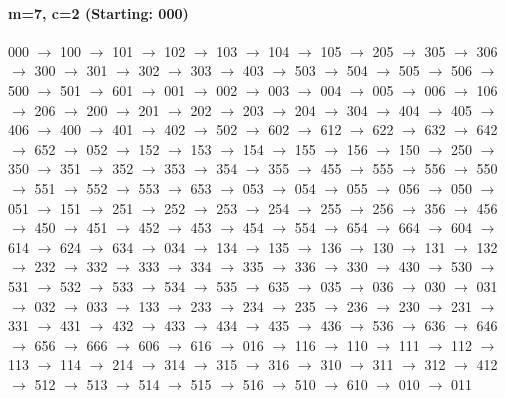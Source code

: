 \paragraph{m=7, c=2 (Starting: 000)}


000 $\rightarrow$ 100 $\rightarrow$ 101 $\rightarrow$ 102 $\rightarrow$ 103 $\rightarrow$ 104 $\rightarrow$ 105 $\rightarrow$ 205 $\rightarrow$ 305 $\rightarrow$ 306 $\rightarrow$ 300 $\rightarrow$ 301 $\rightarrow$ 302 $\rightarrow$ 303 $\rightarrow$ 403 $\rightarrow$ 503 $\rightarrow$ 504 $\rightarrow$ 505 $\rightarrow$ 506 $\rightarrow$ 500 $\rightarrow$ 501 $\rightarrow$ 601 $\rightarrow$ 001 $\rightarrow$ 002 $\rightarrow$ 003 $\rightarrow$ 004 $\rightarrow$ 005 $\rightarrow$ 006 $\rightarrow$ 106 $\rightarrow$ 206 $\rightarrow$ 200 $\rightarrow$ 201 $\rightarrow$ 202 $\rightarrow$ 203 $\rightarrow$ 204 $\rightarrow$ 304 $\rightarrow$ 404 $\rightarrow$ 405 $\rightarrow$ 406 $\rightarrow$ 400 $\rightarrow$ 401 $\rightarrow$ 402 $\rightarrow$ 502 $\rightarrow$ 602 $\rightarrow$ 612 $\rightarrow$ 622 $\rightarrow$ 632 $\rightarrow$ 642 $\rightarrow$ 652 $\rightarrow$ 052 $\rightarrow$ 152 $\rightarrow$ 153 $\rightarrow$ 154 $\rightarrow$ 155 $\rightarrow$ 156 $\rightarrow$ 150 $\rightarrow$ 250 $\rightarrow$ 350 $\rightarrow$ 351 $\rightarrow$ 352 $\rightarrow$ 353 $\rightarrow$ 354 $\rightarrow$ 355 $\rightarrow$ 455 $\rightarrow$ 555 $\rightarrow$ 556 $\rightarrow$ 550 $\rightarrow$ 551 $\rightarrow$ 552 $\rightarrow$ 553 $\rightarrow$ 653 $\rightarrow$ 053 $\rightarrow$ 054 $\rightarrow$ 055 $\rightarrow$ 056 $\rightarrow$ 050 $\rightarrow$ 051 $\rightarrow$ 151 $\rightarrow$ 251 $\rightarrow$ 252 $\rightarrow$ 253 $\rightarrow$ 254 $\rightarrow$ 255 $\rightarrow$ 256 $\rightarrow$ 356 $\rightarrow$ 456 $\rightarrow$ 450 $\rightarrow$ 451 $\rightarrow$ 452 $\rightarrow$ 453 $\rightarrow$ 454 $\rightarrow$ 554 $\rightarrow$ 654 $\rightarrow$ 664 $\rightarrow$ 604 $\rightarrow$ 614 $\rightarrow$ 624 $\rightarrow$ 634 $\rightarrow$ 034 $\rightarrow$ 134 $\rightarrow$ 135 $\rightarrow$ 136 $\rightarrow$ 130 $\rightarrow$ 131 $\rightarrow$ 132 $\rightarrow$ 232 $\rightarrow$ 332 $\rightarrow$ 333 $\rightarrow$ 334 $\rightarrow$ 335 $\rightarrow$ 336 $\rightarrow$ 330 $\rightarrow$ 430 $\rightarrow$ 530 $\rightarrow$ 531 $\rightarrow$ 532 $\rightarrow$ 533 $\rightarrow$ 534 $\rightarrow$ 535 $\rightarrow$ 635 $\rightarrow$ 035 $\rightarrow$ 036 $\rightarrow$ 030 $\rightarrow$ 031 $\rightarrow$ 032 $\rightarrow$ 033 $\rightarrow$ 133 $\rightarrow$ 233 $\rightarrow$ 234 $\rightarrow$ 235 $\rightarrow$ 236 $\rightarrow$ 230 $\rightarrow$ 231 $\rightarrow$ 331 $\rightarrow$ 431 $\rightarrow$ 432 $\rightarrow$ 433 $\rightarrow$ 434 $\rightarrow$ 435 $\rightarrow$ 436 $\rightarrow$ 536 $\rightarrow$ 636 $\rightarrow$ 646 $\rightarrow$ 656 $\rightarrow$ 666 $\rightarrow$ 606 $\rightarrow$ 616 $\rightarrow$ 016 $\rightarrow$ 116 $\rightarrow$ 110 $\rightarrow$ 111 $\rightarrow$ 112 $\rightarrow$ 113 $\rightarrow$ 114 $\rightarrow$ 214 $\rightarrow$ 314 $\rightarrow$ 315 $\rightarrow$ 316 $\rightarrow$ 310 $\rightarrow$ 311 $\rightarrow$ 312 $\rightarrow$ 412 $\rightarrow$ 512 $\rightarrow$ 513 $\rightarrow$ 514 $\rightarrow$ 515 $\rightarrow$ 516 $\rightarrow$ 510 $\rightarrow$ 610 $\rightarrow$ 010 $\rightarrow$ 011 